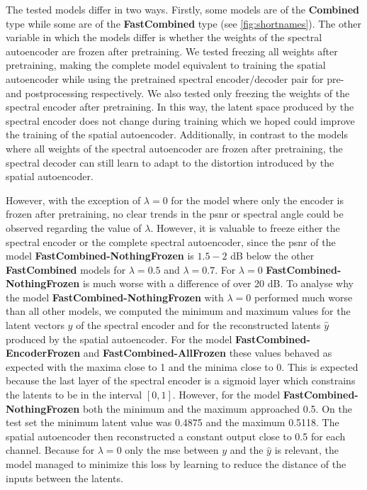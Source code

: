 The tested models differ in two ways. Firstly, some models are of the \textbf{Combined} type while some are of the \textbf{FastCombined} type (see \autoref{fig:shortnames}). The other variable in which the models differ is whether the weights of the spectral autoencoder are frozen after pretraining. We tested freezing all weights after pretraining, making the complete model equivalent to training the spatial autoencoder while using the pretrained spectral encoder/decoder pair for pre- and postprocessing respectively. We also tested only freezing the weights of the spectral encoder after pretraining. In this way, the latent space produced by the spectral encoder does not change during training which we hoped could improve the training of the spatial autoencoder. Additionally, in contrast to the models where all weights of the spectral autoencoder are frozen after pretraining, the spectral decoder can still learn to adapt to the distortion introduced by the spatial autoencoder.

However, with the exception of $\lambda=0$ for the model where only the encoder is frozen after pretraining, no clear trends in the \ac{psnr} or spectral angle could be observed regarding the value of $\lambda$. However, it is valuable to freeze either the spectral encoder or the complete spectral autoencoder, since the \ac{psnr} of the model \textbf{FastCombined-NothingFrozen} is $1.5-2$ dB below the other \textbf{FastCombined} models for $\lambda = 0.5$ and $\lambda = 0.7$. For $\lambda=0$ \textbf{FastCombined-NothingFrozen} is much worse with a difference of over 20 dB. To analyse why the model \textbf{FastCombined-NothingFrozen} with $\lambda=0$ performed much worse than all other models, we computed the minimum and maximum values for the latent vectors $y$ of the spectral encoder and for the reconstructed latents $\hat{y}$ produced by the spatial autoencoder. For the model \textbf{FastCombined-EncoderFrozen} and \textbf{FastCombined-AllFrozen} these values behaved as expected with the maxima close to 1 and the minima close to 0. This is expected because the last layer of the spectral encoder is a sigmoid layer which constrains the latents to be in the interval $[0,1]$. However, for the model \textbf{FastCombined-NothingFrozen} both the minimum and the maximum approached 0.5. On the test set the minimum latent value was 0.4875 and the maximum 0.5118. The spatial autoencoder then reconstructed a constant output close to 0.5 for each channel. Because for $\lambda=0$ only the \ac{mse} between $y$ and the $\hat{y}$ is relevant, the model managed to minimize this loss by learning to reduce the distance of the inputs between the latents.

